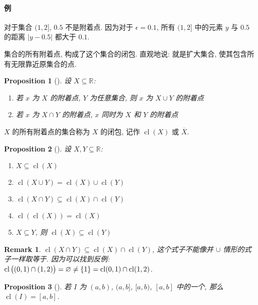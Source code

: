 \documentclass[UTF8]{ctexart}
\theoremstyle{mystyle}
\newtheorem{proposition}{Proposition}[section]
\theoremstyle{myremark}
\newtheorem*{remark}{Remark}
\theoremstyle{plain}
\newcommand{\R}{\mathbb R}
\DeclarePairedDelimiter\set{\{}{\}}
\DeclareMathOperator{\cl}{cl}
\begin{document}
\paragraph{例}
对于集合 $ (1, 2] $, $ 0.5 $ 不是附着点. 因为对于 $ \epsilon = 0.1 $, 所有 $ (1, 2] $ 中的元素 $ y $ 与 $ 0.5 $ 的距离 $ |y - 0.5| $ 都大于 $ 0.1 $.

集合的所有附着点, 构成了这个集合的闭包. 直观地说: 就是扩大集合, 使其包含所有无限靠近原集合的点.

\begin{proposition}[] 设 $ X \subseteq \R $:
    \begin{enumerate}
        \item 若 $ x $ 为 $ X $ 的附着点, $ Y $ 为任意集合, 则 $ x $ 为 $ X \cup Y $ 的附着点
        \item 若 $ x $ 为 $ X \cap Y $ 的附着点, $ x $ 同时为 $ X $ 和 $ Y $ 的附着点
    \end{enumerate}
\end{proposition}

\begin{definition}
    $ X $ 的所有附着点的集合称为 $ X $ 的闭包, 记作 $ \cl (X) $ 或 $ \overline X $.
\end{definition}

\begin{proposition}[] 设 $ X, Y \subseteq \R $:
    \begin{enumerate}
        \item $ X \subseteq \cl (X) $
        \item $ \cl (X \cup Y) = \cl (X) \cup \cl (Y) $
        \item $ \cl (X \cap Y) \subseteq \cl (X) \cap \cl (Y) $
        \item $ \cl (\cl (X)) = \cl (X) $
        \item $ X \subseteq Y $, 则 $ \cl (X) \subseteq \cl (Y) $
    \end{enumerate}
\end{proposition}

\begin{remark}
    $ \cl(X \cap Y) \subseteq \cl(X) \cap \cl(Y) $, 这个式子不能像并 $ \cup $ 情形的式子一样取等于. 因为可以找到反例: $ \cl \big( (0, 1) \cap (1, 2) \big) = \varnothing \neq \set{1} = \cl(0, 1) \cap \cl(1, 2) $.
\end{remark}

\begin{proposition}[]
    若 $ I $ 为 $ (a, b) $, $ (a, b] $, $ [a, b) $, $ [a, b] $ 中的一个, 那么 $ \cl (I) = [a, b] $.
\end{proposition}
\end{document}

